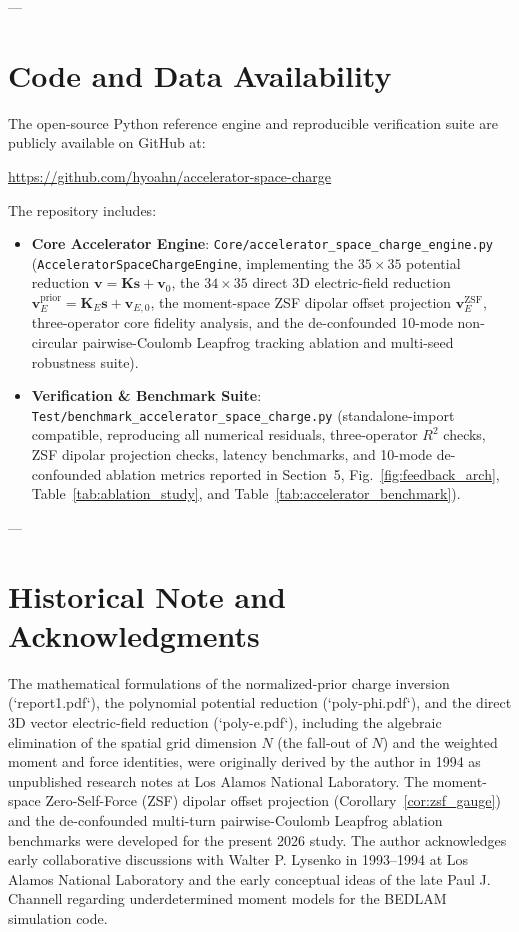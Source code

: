 \documentclass[11pt,a4paper]{article}
\begin{document}
---

\section*{Code and Data Availability}
The open-source Python reference engine and reproducible verification suite are publicly available on GitHub at:
\begin{center}
    \url{https://github.com/hyoahn/accelerator-space-charge}
\end{center}
The repository includes:
{\sloppy
\begin{itemize}
    \item \textbf{Core Accelerator Engine}: \texttt{Core/\allowbreak accelerator\_\allowbreak space\_\allowbreak charge\_\allowbreak engine.py} (\texttt{Accelerator\allowbreak Space\allowbreak Charge\allowbreak Engine}, implementing the $35 \times 35$ potential reduction $\bm{v} = \bm{K}\bm{s} + \bm{v}_0$, the $34 \times 35$ direct 3D electric-field reduction $\bm{v}_E^{\mathrm{prior}} = \bm{K}_E\bm{s} + \bm{v}_{E,0}$, the moment-space ZSF dipolar offset projection $\bm{v}_E^{\mathrm{ZSF}}$, three-operator core fidelity analysis, and the de-confounded 10-mode non-circular pairwise-Coulomb Leapfrog tracking ablation and multi-seed robustness suite).
    \item \textbf{Verification \& Benchmark Suite}: \texttt{Test/\allowbreak benchmark\_\allowbreak accelerator\_\allowbreak space\_\allowbreak charge.py} (standalone-import compatible, reproducing all numerical residuals, three-operator $R^2$ checks, ZSF dipolar projection checks, latency benchmarks, and 10-mode de-confounded ablation metrics reported in Section~5, Fig.~\ref{fig:feedback_arch}, Table~\ref{tab:ablation_study}, and Table~\ref{tab:accelerator_benchmark}).
\end{itemize}
}

---

\section*{Historical Note and Acknowledgments}
The mathematical formulations of the normalized-prior charge inversion (`report1.pdf`), the polynomial potential reduction (`poly-phi.pdf`), and the direct 3D vector electric-field reduction (`poly-e.pdf`), including the algebraic elimination of the spatial grid dimension $N$ (the fall-out of $N$) and the weighted moment and force identities, were originally derived by the author in 1994 as unpublished research notes at Los Alamos National Laboratory. The moment-space Zero-Self-Force (ZSF) dipolar offset projection (Corollary~\ref{cor:zsf_gauge}) and the de-confounded multi-turn pairwise-Coulomb Leapfrog ablation benchmarks were developed for the present 2026 study. The author acknowledges early collaborative discussions with Walter P. Lysenko in 1993--1994 at Los Alamos National Laboratory and the early conceptual ideas of the late Paul J. Channell regarding underdetermined moment models for the BEDLAM simulation code.
\end{document}
